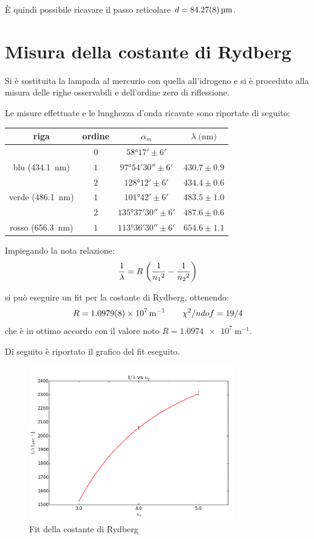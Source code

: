 È quindi possibile ricavare il passo reticolare $d=	\SI{84.27 \pm 0.08}{\micro\meter}$.

\section{Misura della costante di Rydberg}
	Si è sostituita la lampada al mercurio con quella all'idrogeno e si è proceduto alla misura delle righe osservabili e dell'ordine zero di riflessione.
	
	Le misure effettuate e le lunghezza d'onda ricavate sono riportate di seguito:
	\smallskip
	\begin{table}[H]
	\centering
		\begin{tabular}{c|c|c|c}
			riga & ordine & $\alpha _{m}$ & $\lambda \;\text{(nm)}$ \\
		\hline
		& $ 0 $ &$\ang{58;17;} \pm 6' $ &\\
		\hline
		blu (\SI{434.1}{\nano\meter})& $ 1 $ &$\ang{97;54;30} \pm 6' $ & $430.7 \pm 0.9$\\
		\hline
		 & $ 2$ & $\ang{128;12;} \pm 6' $ &$434.4 \pm 0.6$\\
		\hline
		verde (\SI{486.1}{\nano\meter}) & $ 1$ & $\ang{101;42;} \pm 6' $ &$483.5 \pm 1.0$\\
		\hline
		 &$ 2$ & $\ang{135;37;30} \pm 6' $&$487.6 \pm 0.6$ \\
		\hline
		rosso (\SI{656.3}{\nano\meter})&$1$ & $\ang{113;36;30} \pm 6' $ &$654.6 \pm 1.1$\\
		\end{tabular}
	\end{table}
	\smallskip

	Impiegando la nota relazione:
	\smallskip
	\begin{equation*}\label{eq:ryd}
	\frac{1}{\lambda}=R\;\biggl(\frac{1}{{n_1}^2}-\frac{1}{{n_2}^2}\biggr)
		\smallskip
	\end{equation*}

si può eseguire un fit per la costante di Rydberg, ottenendo:
$$R= \SI{1.0979\pm0.0008e7}{\meter^{-1}} \qquad \chi^2/ndof = 19/4$$ che è in ottimo accordo con il valore noto $R= \SI{1.0974e7}{\meter^{-1}}$. 

Di seguito è riportato il grafico del fit eseguito.

	\begin{figure} [H]
		\centering
		\includegraphics[width=0.8\textwidth]{../FIgs-tabs/fit_R.png}
		\caption{Fit della costante di Rydberg}
	\end{figure}

